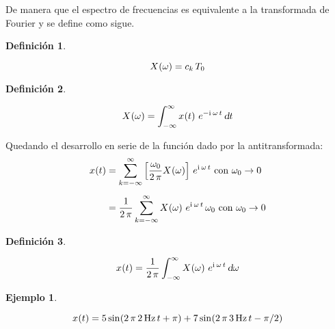 \documentclass[a5paper,12pt,twoside]{book}
\newtheorem{defn}{{Definición}}[chapter]
\newtheorem{example}{{Ejemplo}}[chapter]
\begin{document}
De manera que el espectro de frecuencias es equivalente a la transformada de Fourier y se define como sigue.

\begin{mdframed}[style=MyFrame1]
    \begin{defn}
    \end{defn}
    \begin{equation*}
        \fx[X]{\omega} = c_k \, T_0
    \end{equation*}
\end{mdframed}

\begin{mdframed}[style=MyFrame1]
    \begin{defn}
        \label{defn:FourierTrans}
    \end{defn}
    \begin{equation*}
        \fx[X]{\omega} = \int_{-\infty}^\infty \fx[x]{t} \, e^{-\iu \, \omega \, t} \, \dif t
    \end{equation*}
\end{mdframed}

Quedando el desarrollo en serie de la función dado por la antitransformada:
\begin{align*}
    \fx[x]{t} &= \sum_{\kth=-\infty}^\infty \left[ \frac{\omega_0}{2 \, \pi} \fx[X]{\omega} \right] \, e^{\iu \, \omega \, t} \text{ con } \omega_0 \to 0
    \\[1ex]
    &= \frac{1}{2 \, \pi} \sum_{\kth=-\infty}^\infty \fx[X]{\omega} \, e^{\iu \, \omega \, t} \, \omega_0 \text{ con } \omega_0 \to 0
\end{align*}

\begin{mdframed}[style=MyFrame1]
    \begin{defn}
        \label{defn:FourierTransInv}
    \end{defn}
    \begin{equation*}
        \fx[x]{t} = \frac{1}{2 \, \pi} \int_{-\infty}^\infty \fx[X]{\omega} \, e^{\iu \, \omega \, t} \, \dif \omega
    \end{equation*}
\end{mdframed}

\begin{mdframed}[style=MyFrame2]
    \begin{example}
    \end{example}
    \begin{equation*}
        \fx[x]{t} = 5 \fx[\sin]{2 \, \pi \, \SI{2}{\hertz} \, t + \pi} + 7 \fx[\sin]{2 \, \pi \, \SI{3}{\hertz} \, t - \pi/2}
    \end{equation*}
    \begin{center}
        \def\svgwidth{0.6\linewidth}
        
    \end{center}
    \begin{center}
        \def\svgwidth{\linewidth}
        
    \end{center}
\end{mdframed}
\end{document}
